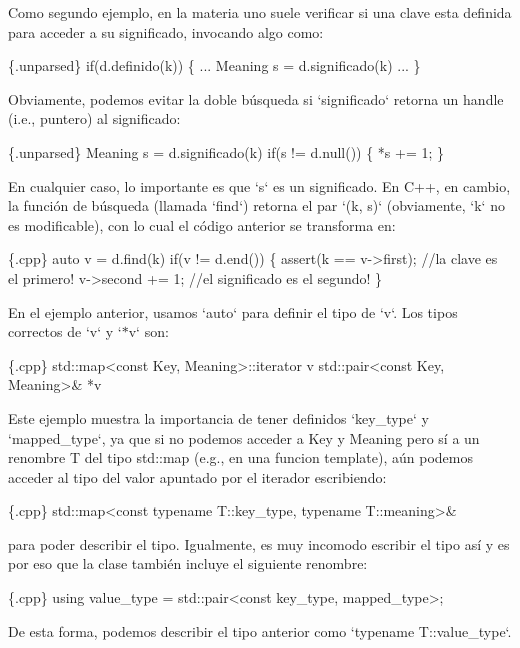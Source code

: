 \-Como segundo ejemplo, en la materia uno suele verificar si una clave esta definida para acceder a su significado, invocando algo como\-: 
\begin{DoxyCode}
 \{.unparsed\}
 \textcolor{keywordflow}{if}(d.definido(k)) \{ ... Meaning s = d.significado(k) ... \}
\end{DoxyCode}
 \-Obviamente, podemos evitar la doble búsqueda si `significado` retorna un handle (i.\-e., puntero) al significado\-: 
\begin{DoxyCode}
 \{.unparsed\}
 Meaning s = d.significado(k)
 \textcolor{keywordflow}{if}(s != d.null()) \{ *s += 1; \}
\end{DoxyCode}
 \-En cualquier caso, lo importante es que `s` es un significado. \-En \-C++, en cambio, la función de búsqueda (llamada `find`) retorna el par `(k, s)` (obviamente, `k` no es modificable), con lo cual el código anterior se transforma en\-: 
\begin{DoxyCode}
 \{.cpp\}
 \textcolor{keyword}{auto} v = d.find(k)
 \textcolor{keywordflow}{if}(v != d.end()) \{
    assert(k == v->first); \textcolor{comment}{//la clave es el primero!}
    v->second += 1;        \textcolor{comment}{//el significado es el segundo!}
 \}
\end{DoxyCode}


\-En el ejemplo anterior, usamos `auto` para definir el tipo de `v`. \-Los tipos correctos de `v` y `$\ast$v` son\-: 
\begin{DoxyCode}
 \{.cpp\}
 std::map<const Key, Meaning>::iterator v
 std::pair<const Key, Meaning>& *v
\end{DoxyCode}
 \-Este ejemplo muestra la importancia de tener definidos `key\-\_\-type` y `mapped\-\_\-type`, ya que si no podemos acceder a \-Key y \-Meaning pero sí a un renombre \-T del tipo std\-::map (e.\-g., en una funcion template), aún podemos acceder al tipo del valor apuntado por el iterador escribiendo\-: 
\begin{DoxyCode}
 \{.cpp\}
 std::map<const typename T::key\_type, typename T::meaning>&
\end{DoxyCode}
 para poder describir el tipo. \-Igualmente, es muy incomodo escribir el tipo así y es por eso que la clase también incluye el siguiente renombre\-: 
\begin{DoxyCode}
 \{.cpp\}
 \textcolor{keyword}{using} value\_type = std::pair<const key\_type, mapped\_type>;
\end{DoxyCode}
 \-De esta forma, podemos describir el tipo anterior como `typename \-T\-::value\-\_\-type`.

